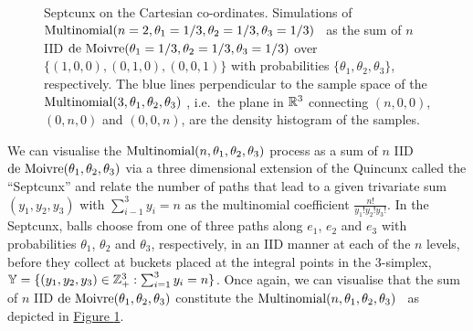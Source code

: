 \begin{figure}[htpb]
\caption{Septcunx on the Cartesian co-ordinates.  Simulations of $\mbox{{\rm Multinomial}}(n=2,\theta_1=1/3,\theta_2=1/3,\theta_3=1/3)$ \rv~as the sum of $n$ IID $\mbox{{\rm de~Moivre}}(\theta_1=1/3,\theta_2=1/3,\theta_3=1/3)$  over $\{(1,0,0),(0,1,0),(0,0,1)\}$ with probabilities $\{\theta_1,\theta_2,\theta_3\}$, respectively.  The blue lines perpendicular to the sample space of the $\mbox{{\rm Multinomial}}(3,\theta_1,\theta_2,\theta_3)$ \rv, i.e.~the plane in $\mathbb{R}^3$ connecting $(n,0,0)$, $(0,n,0)$ and $(0,0,n)$, are the density histogram of the samples.\label{F:MultinomSeptcunxn2n10r1000}}
\centering
\mbox{ \hspace{-2cm}
	    }
\end{figure}

We can visualise the $\mbox{{\rm Multinomial}}(n,\theta_1,\theta_2,\theta_3)$ process as a sum of $n$ IID $\mbox{{\rm de~Moivre}}(\theta_1,\theta_2,\theta_3)$  via a three dimensional extension of the Quincunx called the ``Septcunx'' and relate the number of paths that lead to a given trivariate sum $(y_1,y_2,y_3)$ with $\sum_{i-1}^3 y_i = n$ as the multinomial coefficient $\frac{n!}{y_1! y_2! y_3!}$.  In the Septcunx, balls choose from one of three paths along $e_1$, $e_2$ and $e_3$ with probabilities $\theta_1$, $\theta_2$ and $\theta_3$, respectively, in an IID manner at each of the $n$ levels, before they collect at buckets placed at the integral points in the $3$-simplex, $\mathbb{Y} = \{(y_1,y_2,y_3) \in \mathbb{Z}_+^3 : \sum_{i=1}^3 y_i=n \}$.  Once again, we can visualise that the sum of $n$ IID $\mbox{{\rm de~Moivre}}(\theta_1,\theta_2,\theta_3)$  constitute the $\mbox{{\rm Multinomial}}(n,\theta_1,\theta_2,\theta_3)$ \rv~as depicted in \hyperref[F:MultinomSeptcunxn2n10r1000]{Figure \ref*{F:MultinomSeptcunxn2n10r1000}}.

